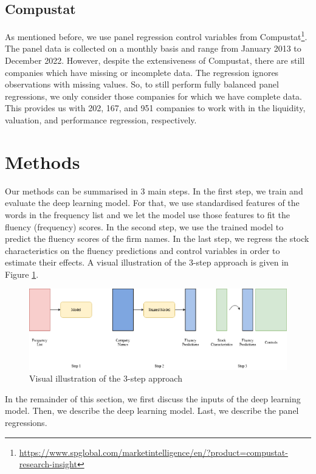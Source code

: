 \documentclass[11pt]{article}
\begin{document}
\subsection{Compustat}
As mentioned before, we use panel regression control variables from Compustat\footnote{\url{https://www.spglobal.com/marketintelligence/en/?product=compustat-research-insight}}. The panel data is collected on a monthly basis and range from January 2013 to December 2022. However, despite the extensiveness of Compustat, there are still companies which have missing or incomplete data. The regression ignores observations with missing values. So, to still perform fully balanced panel regressions, we only consider those companies for which we have complete data. This provides us with 202, 167, and 951 companies to work with in the liquidity, valuation, and performance regression, respectively.




\newpage
\section{Methods}
Our methods can be summarised in 3 main steps. In the first step, we train and evaluate the deep learning model. For that, we use standardised features of the words in the frequency list and we let the model use those features to fit the fluency (frequency) scores. In the second step, we use the trained model to predict the fluency scores of the firm names. In the last step, we regress the stock characteristics on the fluency predictions and control variables in order to estimate their effects. A visual illustration of the 3-step approach is given in Figure \ref{fig:overview}.

\vspace{0.5cm}
\begin{figure}[h]
    \centering
    \includegraphics[scale=0.45]{figures/steps.png}
    \caption{Visual illustration of the 3-step approach}
    \label{fig:overview}
\end{figure}
\vspace{0.5cm}
\noindent
In the remainder of this section, we first discuss the inputs of the deep learning model. Then, we describe the deep learning model. Last, we describe the panel regressions.
\end{document}

